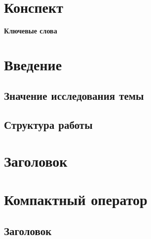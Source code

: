 \documentclass[openany]{book}
\theoremstyle{definition}
\begin{document}
\pagestyle{empty} %

\frontmatter

\chapter{Конспект}
\renewcommand{\thepage}{\Roman{page}} %


\vspace{1.5cm}
\begin{center}
    {\bfseries Ключевые слова}

\end{center}





\newpage  %
\thispagestyle{empty}


\newpage
\makeatletter
\renewcommand*\l@chapter{\@dottedtocline{0}{0em}{5em}}
\makeatother

\tableofcontents   %

\mainmatter  %
\chapter{Введение}  %
\pagestyle{fancy}
\renewcommand{\thepage}{\arabic{page}} %

\setcounter{page}{1}  %

\section{Значение исследования темы}



\section{Структура работы}



\chapter{Заголовок}    %
\pagestyle{fancy}


\chapter{Компактный оператор}
\pagestyle{fancy}


\section{Заголовок}
\end{document}
